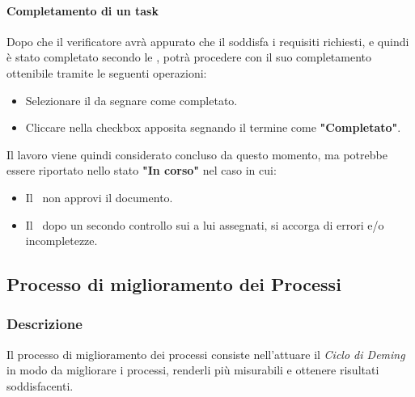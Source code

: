 \paragraph{Completamento di un task}
Dopo che il verificatore avrà appurato che il  soddisfa i requisiti richiesti, e quindi è stato completato secondo le \NdP, potrà procedere con il suo completamento ottenibile tramite le seguenti operazioni:
\begin{itemize}
  \item Selezionare il  da segnare come completato.
  \item Cliccare nella checkbox apposita segnando il termine come \textbf{"Completato"}.
\end{itemize}
Il lavoro viene quindi considerato concluso da questo momento, ma potrebbe essere riportato nello stato \textbf{"In corso"} nel caso in cui:
\begin{itemize}
  \item Il \Pm\ non approvi il documento.
  \item Il \Ver\, dopo un secondo controllo sui  a lui assegnati, si accorga di errori e/o incompletezze. 
\end{itemize}

\subsection{Processo di miglioramento dei Processi}
\subsubsection{Descrizione}
Il processo di miglioramento dei processi consiste nell'attuare il \textit{Ciclo di Deming} in modo da migliorare i processi, renderli più misurabili e ottenere risultati soddisfacenti.

